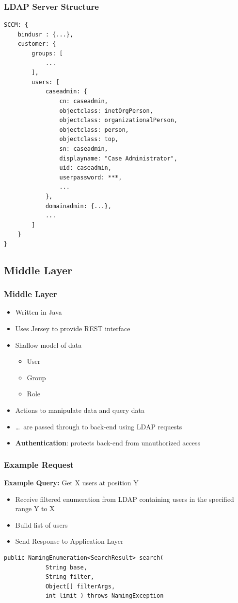 \documentclass{beamer}
\begin{document}
\begin{frame}[fragile]
	\frametitle{LDAP Server Structure}
	\lstset{%
		basicstyle=\tiny
	}
	\begin{lstlisting}
SCCM: {
	bindusr : {...},
	customer: {
		groups: [
			...
		],
		users: [
			caseadmin: {
				cn: caseadmin,
				objectclass: inetOrgPerson,
				objectclass: organizationalPerson,
				objectclass: person,
				objectclass: top,
				sn: caseadmin,
				displayname: "Case Administrator",
				uid: caseadmin,
				userpassword: ***,
				...
			},
			domainadmin: {...},
			...
		]
	}
}
	\end{lstlisting}
\end{frame}

\subsection{Middle Layer}

\begin{frame}
	\frametitle{Middle Layer}
	\begin{itemize}
		\item Written in Java
		\item Uses Jersey to provide REST interface
		\item Shallow model of data
			\begin{itemize}
				\item User
				\item Group
				\item Role
			\end{itemize}
		\item Actions to manipulate data and query data
		\item \dots\ are passed through to back-end using LDAP requests
		\item \textbf{Authentication}: protects back-end from
			unauthorized access
	\end{itemize}
\end{frame}

\begin{frame}[fragile]
	\frametitle{Example Request}
	\textbf{Example Query:} Get X users at position Y
	\begin{itemize}
	 \item Receive filtered enumeration from LDAP containing users in the specified range Y to X
	 \item Build list of users
	 \item Send Response to Application Layer
	\end{itemize}
\begin{lstlisting}[frame=single]
public NamingEnumeration<SearchResult> search(
            String base,
            String filter,
            Object[] filterArgs,
            int limit ) throws NamingException
\end{lstlisting}
\end{frame}
\end{document}
